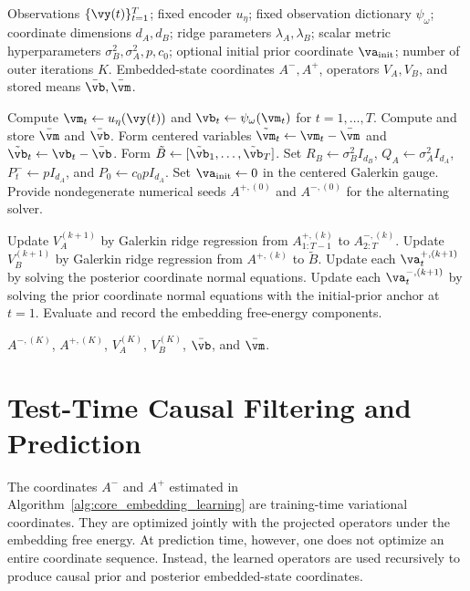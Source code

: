 \documentclass[twoside,11pt]{article}
\begin{document}
\begin{algorithm}[t]
\caption{Core Embedded-State Galerkin Learning}
\label{alg:core_embedding_learning}
\begin{algorithmic}[1]
\Require Observations $\{\vy(t)\}_{t=1}^T$; fixed encoder $u_\eta$;
fixed observation dictionary $\psi_\omega$; coordinate dimensions
$d_A,d_B$; ridge parameters $\lambda_A,\lambda_B$; scalar metric
hyperparameters $\sigma_B^2,\sigma_A^2,p,c_0$; optional initial prior
coordinate $\va_{\mathrm{init}}$; number of outer iterations $K$.
\Ensure Embedded-state coordinates $A^-,A^+$, operators $V_A,V_B$, and
stored means $\bar{\vb},\bar{\vm}$.

\State Compute $\vm_t\gets u_\eta(\vy(t))$ and
$\vb_t\gets \psi_\omega(\vm_t)$ for $t=1,\dots,T$.
\State Compute and store $\bar{\vm}$ and $\bar{\vb}$.
\State Form centered variables
$\tilde{\vm}_t\gets\vm_t-\bar{\vm}$ and
$\tilde{\vb}_t\gets\vb_t-\bar{\vb}$.
\State Form $\tilde B\gets[\tilde{\vb}_1,\dots,\tilde{\vb}_T]$.
\State Set
$R_B\gets\sigma_B^2I_{d_B}$,
$Q_A\gets\sigma_A^2I_{d_A}$,
$P_t^-\gets pI_{d_A}$, and
$P_0\gets c_0pI_{d_A}$.
    \State Set $\va_{\mathrm{init}}\gets 0$ in the centered Galerkin gauge.
\EndIf
\State Provide nondegenerate numerical seeds
$A^{+,(0)}$ and $A^{-,(0)}$ for the alternating solver.

    \State Update $V_A^{(k+1)}$ by Galerkin ridge regression from
    $A_{1:T-1}^{+,(k)}$ to $A_{2:T}^{-,(k)}$.
    \State Update $V_B^{(k+1)}$ by Galerkin ridge regression from
    $A^{+,(k)}$ to $\tilde B$.
    \State Update each $\va_t^{+,(k+1)}$ by solving the posterior
    coordinate normal equations.
    \State Update each $\va_t^{-,(k+1)}$ by solving the prior
    coordinate normal equations with the initial-prior anchor at
    $t=1$.
    \State Evaluate and record the embedding free-energy components.
\EndFor

\State \Return $A^{-,(K)}$, $A^{+,(K)}$, $V_A^{(K)}$, $V_B^{(K)}$,
$\bar{\vb}$, and $\bar{\vm}$.
\end{algorithmic}
\end{algorithm}

\section{Test-Time Causal Filtering and Prediction}
\label{sec:test_time_filtering_prediction}

The coordinates $A^-$ and $A^+$ estimated in
Algorithm~\ref{alg:core_embedding_learning} are training-time
variational coordinates. They are optimized jointly with the projected
operators under the embedding free energy. At prediction time, however,
one does not optimize an entire coordinate sequence. Instead, the
learned operators are used recursively to produce causal prior and
posterior embedded-state coordinates.
\end{document}
